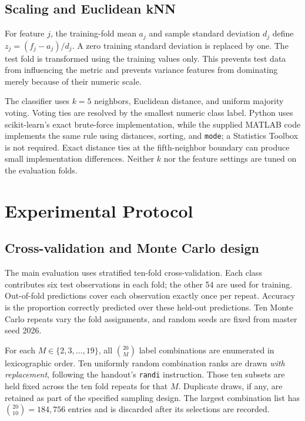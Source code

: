 \documentclass[journal]{IEEEtran}
\begin{document}
\subsection{Scaling and Euclidean kNN}
For feature $j$, the training-fold mean $a_j$ and sample standard deviation $d_j$ define $z_j=(f_j-a_j)/d_j$. A zero training standard deviation is replaced by one. The test fold is transformed using the training values only. This prevents test data from influencing the metric and prevents variance features from dominating merely because of their numeric scale.

The classifier uses $k=5$ neighbors, Euclidean distance, and uniform majority voting. Voting ties are resolved by the smallest numeric class label. Python uses scikit-learn's exact brute-force implementation, while the supplied MATLAB code implements the same rule using distances, sorting, and \texttt{mode}; a Statistics Toolbox is not required. Exact distance ties at the fifth-neighbor boundary can produce small implementation differences. Neither $k$ nor the feature settings are tuned on the evaluation folds.

\section{Experimental Protocol}
\subsection{Cross-validation and Monte Carlo design}
The main evaluation uses stratified ten-fold cross-validation. Each class contributes six test observations in each fold; the other 54 are used for training. Out-of-fold predictions cover each observation exactly once per repeat. Accuracy is the proportion correctly predicted over these held-out predictions. Ten Monte Carlo repeats vary the fold assignments, and random seeds are fixed from master seed 2026.

For each $M\in\{2,3,\ldots,19\}$, all $\binom{20}{M}$ label combinations are enumerated in lexicographic order. Ten uniformly random combination ranks are drawn \emph{with replacement}, following the handout's \texttt{randi} instruction. Those ten subsets are held fixed across the ten fold repeats for that $M$. Duplicate draws, if any, are retained as part of the specified sampling design. The largest combination list has $\binom{20}{10}=184,756$ entries and is discarded after its selections are recorded.
\end{document}
